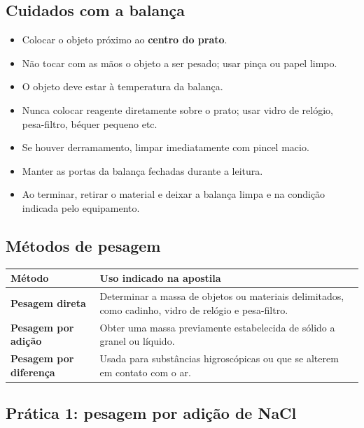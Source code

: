 \documentclass[a4paper,12pt]{article}
\begin{document}
\subsection{Cuidados com a balança}

\begin{itemize}[leftmargin=1.6em]
    \item Colocar o objeto próximo ao \textbf{centro do prato}.
    \item Não tocar com as mãos o objeto a ser pesado; usar pinça ou papel limpo.
    \item O objeto deve estar à temperatura da balança.
    \item Nunca colocar reagente diretamente sobre o prato; usar vidro de relógio, pesa-filtro, béquer pequeno etc.
    \item Se houver derramamento, limpar imediatamente com pincel macio.
    \item Manter as portas da balança fechadas durante a leitura.
    \item Ao terminar, retirar o material e deixar a balança limpa e na condição indicada pelo equipamento.
\end{itemize}

\subsection{Métodos de pesagem}

\begin{center}
\begin{tabularx}{\textwidth}{>{\bfseries}p{3.7cm} X}
\toprule
Método & Uso indicado na apostila \\
\midrule
Pesagem direta & Determinar a massa de objetos ou materiais delimitados, como cadinho, vidro de relógio e pesa-filtro. \\
Pesagem por adição & Obter uma massa previamente estabelecida de sólido a granel ou líquido. \\
Pesagem por diferença & Usada para substâncias higroscópicas ou que se alterem em contato com o ar. \\
\bottomrule
\end{tabularx}
\end{center}

\subsection{Prática 1: pesagem por adição de NaCl}
\end{document}
